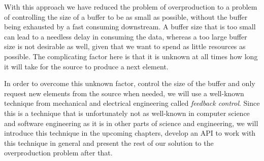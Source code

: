 With this approach we have reduced the problem of overproduction to a problem of controlling the size of a buffer to be as small as possible, without the buffer being exhausted by a fast consuming downstream. A buffer size that is too small can lead to a needless delay in consuming the data, whereas a too large buffer size is not desirable as well, given that we want to spend as little resources as possible. The complicating factor here is that it is unknown at all times how long it will take for the source to produce a next element.

In order to overcome this unknown factor, control the size of the buffer and only request new elements from the source when needed, we will use a well-known technique from mechanical and electrical engineering called \textit{feedback control}. Since this is a technique that is unfortunately not as well-known in computer science and software engineering as it is in other parts of science and engineering, we will introduce this technique in the upcoming chapters, develop an API to work with this technique in general and present the rest of our solution to the overproduction problem after that.
